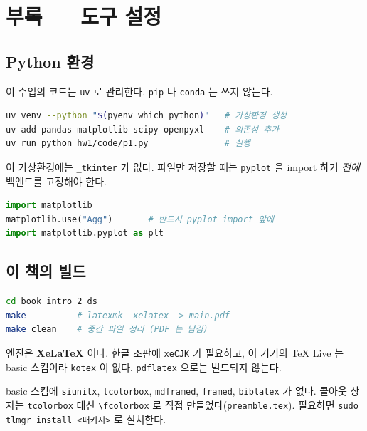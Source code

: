 \chapter{부록 --- 도구 설정}
\label{ch:toolchain}

\section{Python 환경}
\label{sec:python-env}

이 수업의 코드는 \texttt{uv} 로 관리한다. \texttt{pip} 나 \texttt{conda} 는 쓰지
않는다.

\begin{lstlisting}[language=bash]
uv venv --python "$(pyenv which python)"   # 가상환경 생성
uv add pandas matplotlib scipy openpyxl    # 의존성 추가
uv run python hw1/code/p1.py               # 실행
\end{lstlisting}

\begin{pitfall}
이 가상환경에는 \texttt{\_tkinter} 가 없다. 파일만 저장할 때는 \texttt{pyplot} 을
import 하기 \emph{전에} 백엔드를 고정해야 한다.

\begin{lstlisting}[language=Python]
import matplotlib
matplotlib.use("Agg")       # 반드시 pyplot import 앞에
import matplotlib.pyplot as plt
\end{lstlisting}
\end{pitfall}

\section{이 책의 빌드}
\label{sec:book-build}

\begin{lstlisting}[language=bash]
cd book_intro_2_ds
make          # latexmk -xelatex -> main.pdf
make clean    # 중간 파일 정리 (PDF 는 남김)
\end{lstlisting}

엔진은 \textbf{XeLaTeX} 이다. 한글 조판에 \texttt{xeCJK} 가 필요하고, 이 기기의
TeX Live 는 basic 스킴이라 \texttt{kotex} 이 없다. \texttt{pdflatex} 으로는
빌드되지 않는다.

\begin{aside}[없는 패키지와 그 대체]
basic 스킴에 \texttt{siunitx}, \texttt{tcolorbox}, \texttt{mdframed},
\texttt{framed}, \texttt{biblatex} 가 없다. 콜아웃 상자는 \texttt{tcolorbox} 대신
\texttt{\textbackslash fcolorbox} 로 직접 만들었다(\texttt{preamble.tex}).
필요하면 \texttt{sudo tlmgr install <패키지>} 로 설치한다.
\end{aside}

